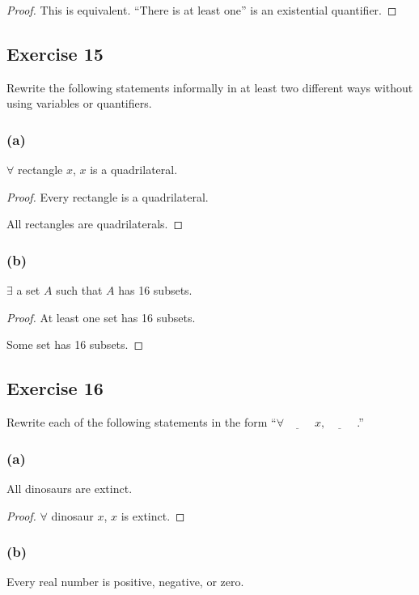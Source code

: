\documentclass[14pt]{extarticle}
\newcommand{\fbl}{\underline{\hspace{1cm}}\,\,}
\newcommand{\fa}{\forall}
\newcommand{\te}{\exists}
\begin{document}
\begin{proof}
This is equivalent. ``There is at least one'' is an existential quantifier.
\end{proof}

\subsection{Exercise 15}
Rewrite the following statements informally in at least two different ways without using variables or quantifiers.

\subsubsection{(a)}
$\fa$ rectangle $x$, $x$ is a quadrilateral.

\begin{proof}
Every rectangle is a quadrilateral.

All rectangles are quadrilaterals.
\end{proof}

\subsubsection{(b)}
$\te$ a set $A$ such that $A$ has 16 subsets.

\begin{proof}
At least one set has 16 subsets.

Some set has 16 subsets.
\end{proof}

\subsection{Exercise 16}
Rewrite each of the following statements in the form “$\fa \fbl x, \fbl$.”

\subsubsection{(a)}
All dinosaurs are extinct.

\begin{proof}
$\fa$ dinosaur $x$, $x$ is extinct.
\end{proof}

\subsubsection{(b)}
Every real number is positive, negative, or zero.
\end{document}
